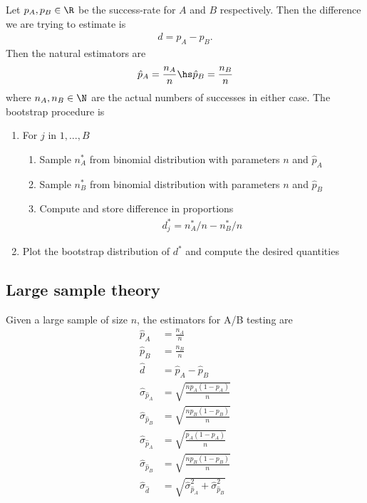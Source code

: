 \documentclass{article}
\begin{document}
Let $p_A,p_B\in\R$ be the success-rate for $A$ and $B$ respectively. Then the
difference we are trying to estimate is
\begin{align*}
	d = p_A - p_B.
\end{align*}
Then the natural estimators are
\begin{align*}
	\hat p_A = \frac{n_A}{n}\hs \hat p_B = \frac{n_B}{n}
\end{align*}
where $n_A,n_B\in\N$ are the actual numbers of successes in either case.
The bootstrap procedure is
\begin{enumerate}
	\item For $j$ in $1,...,B$ \begin{enumerate}
		      \item Sample $n^*_A$ from binomial distribution with parameters $n$ and $\hat p_A$
		      \item Sample $n^*_B$ from binomial distribution with parameters $n$ and $\hat p_B$
		      \item Compute and store difference in proportions \begin{align*}
			            d^*_j = n^*_A/n - n^*_B/n
		            \end{align*}
	      \end{enumerate}
	\item Plot the bootstrap distribution of $d^*$ and compute the desired quantities
\end{enumerate}

\subsection{Large sample theory}

\begin{theorem}
	Given a large sample of size $n$, the estimators for A/B testing are
	\begin{align*}
		\hat p_A              & = \frac{n_A}{n}                                            \\
		\hat p_B              & =\frac{n_B}{n}                                             \\
		\hat d                & = \hat p_A - \hat p_B                                      \\
		\hat\sigma_{\hat p_A} & = \sqrt{\frac{np_A(1-p_A)}{n}}                             \\
		\hat\sigma_{\hat p_B} & = \sqrt{\frac{np_B(1-p_B)}{n}}                             \\
		\hat\sigma_{\hat p_A} & = \sqrt{\frac{p_A(1-p_A)}{n}}                              \\
		\hat\sigma_{\hat p_B} & = \sqrt{\frac{np_B(1-p_B)}{n}}                             \\
		\hat\sigma_{\hat d}   & = \sqrt{\hat\sigma^2_{\hat p_A} + \hat\sigma^2_{\hat p_B}}
	\end{align*}
\end{theorem}
\end{document}
